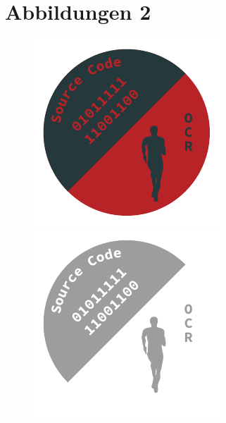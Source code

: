 \documentclass[a4paper,fontsize=14pt,DIV=calc,fleqn,parskip=half]{scrartcl}
\begin{document}
	\newpage
	\section*{Abbildungen 2}%
	\begin{figure}[!h]%
		\centering
		\begin{minipage}[b]{0.40\textwidth}
			\includegraphics[width=\textwidth]{images/Logo/Logo-negativ}%
		\end{minipage}
		\hfill
		\begin{minipage}[b]{0.30\textwidth}
			\includegraphics[width=\textwidth]{images/Logo/Logo-Grau}%

\end{minipage}
\end{figure}
\end{document}
